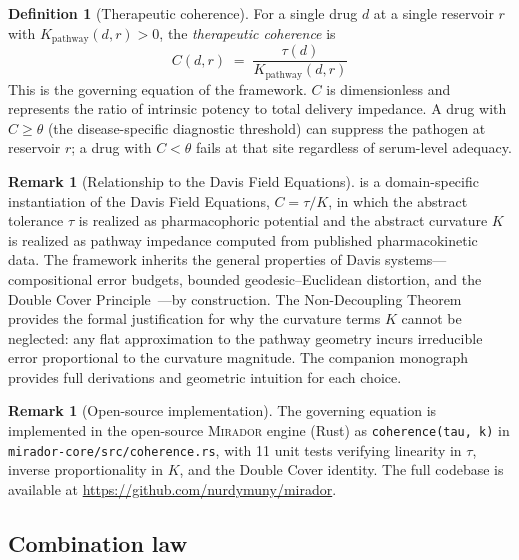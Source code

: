 \documentclass[11pt]{article}
\theoremstyle{plain}
\theoremstyle{definition}
\newtheorem{definition}[theorem]{Definition}
\newtheorem{remark}[theorem]{Remark}
\newcommand{\mirador}{\textsc{Mirador}}
\newcommand{\Kpath}{K_{\mathrm{pathway}}}
\begin{document}
\begin{definition}[Therapeutic coherence]
\label{def:coherence}
For a single drug $d$ at a single reservoir $r$ with
$\Kpath(d, r) > 0$, the \emph{therapeutic coherence} is
\begin{equation}
  \label{eq:coherence}
  \boxed{\;C(d, r) \;=\; \frac{\tau(d)}{\Kpath(d, r)}\;}
\end{equation}
This is the governing equation of the framework. $C$ is
dimensionless and represents the ratio of intrinsic potency to
total delivery impedance. A drug with $C \geq \theta$ (the
disease-specific diagnostic threshold) can suppress the pathogen at
reservoir $r$; a drug with $C < \theta$ fails at that site
regardless of serum-level adequacy.
\end{definition}

\begin{remark}[Relationship to the Davis Field Equations]
\label{rem:davis}
 is a domain-specific instantiation of the
Davis Field Equations, $C = \tau / K$, in which the abstract
tolerance $\tau$ is realized as pharmacophoric potential and the
abstract curvature $K$ is realized as pathway impedance computed
from published pharmacokinetic data. The framework inherits the
general properties of Davis systems---compositional error budgets,
bounded geodesic--Euclidean distortion, and the Double Cover
Principle~\cite{DavisDoubleCover}---by construction. The
Non-Decoupling Theorem~\cite{DavisNonDecoupling} provides the
formal justification for why the curvature terms $K$ cannot be
neglected: any flat approximation to the pathway geometry incurs
irreducible error proportional to the curvature magnitude. The
companion monograph~\cite{DavisMonograph} provides full
derivations and geometric intuition for each choice.
\end{remark}

\begin{remark}[Open-source implementation]
\label{rem:implementation-coherence}
The governing equation is implemented in the open-source \mirador{}
engine (Rust) as \texttt{coherence(tau, k)} in
\texttt{mirador-core/src/coherence.rs}, with 11 unit tests
verifying linearity in $\tau$, inverse proportionality in $K$,
and the Double Cover identity. The full codebase is available at
\url{https://github.com/nurdymuny/mirador}.
\end{remark}

\subsection{Combination law}
\label{sec:combination-law}
\end{document}
